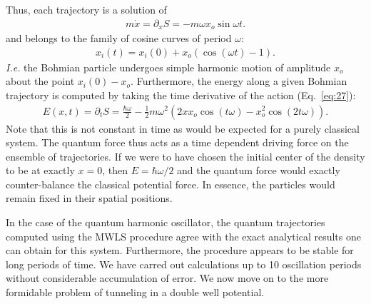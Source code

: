 Thus, each trajectory is a solution of
\begin{eqnarray}
m\dot{x} = \partial_x S   = -m   \omega    {x_o}\sin\omega    t. \label{eq28}
\end{eqnarray}
and belongs to the family of cosine curves of period 
$\omega$:
\begin{eqnarray}
x_i(t) = x_i(0) +x_o(\cos(\omega t) -1) .
    \label{eq:29}
\end{eqnarray}
{\em I.e.}  the Bohmian particle undergoes simple 
harmonic motion of amplitude $x_o$ about 
the point $x_i(0)-x_o$.
Furthermore, the energy along a given Bohmian trajectory is computed 
by taking the time derivative of the action (Eq.~\ref{eq:27}):
\begin{eqnarray}
E(x,t) =  \partial_t S  = \frac{\hbar \omega}{2}
-\frac{1}{2}  m \omega^2
(2 x x_o\cos(t   \omega ) -x_o^2\cos(2   t   \omega )   ).
    \label{eq:30}
\end{eqnarray}
Note that this is not constant in time as would be expected for a 
purely classical system.  The quantum force thus acts as a time 
dependent driving force on the ensemble of trajectories.  If we were 
to have chosen the initial center of the density to be at exactly $x 
=0$, then $E =\hbar\omega/2$ and the quantum force would exactly 
counter-balance the classical potential force.  In essence, the 
particles would remain fixed in their spatial positions.

In the case of the quantum harmonic oscillator, the quantum 
trajectories computed using the MWLS procedure agree with the exact 
analytical results one can obtain for this system.  Furthermore, the 
procedure appears to be stable for long periods of time.  We have 
carred out calculations up to 10 oscillation periods without 
considerable accumulation of error.  We now move on to the more 
formidable problem of tunneling in a double well potential.

